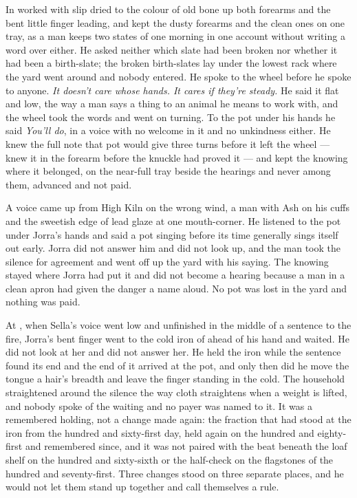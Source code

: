 \scenebreak

In   worked with slip dried to the colour of old bone up both forearms and the bent little finger leading, and kept the dusty forearms and the clean ones on one tray, as a man keeps two states of one morning in one account without writing a word over either. He asked neither which slate had been broken nor whether it had been a birth-slate; the broken birth-slates lay under the lowest rack where the yard went around and nobody entered. He spoke to the wheel before he spoke to anyone. \emph{It doesn't care whose hands. It cares if they're steady.} He said it flat and low, the way a man says a thing to an animal he means to work with, and the wheel took the words and went on turning. To the pot under his hands he said \emph{You'll do}, in a voice with no welcome in it and no unkindness either. He knew the full note that pot would give three turns before it left the wheel --- knew it in the forearm before the knuckle had proved it --- and kept the knowing where it belonged, on the near-full tray beside the hearings and never among them, advanced and not paid.

A voice came up from High Kiln on the wrong wind, a man with Ash on his cuffs and the sweetish edge of lead glaze at one mouth-corner. He listened to the pot under Jorra's hands and said a pot singing before its time generally sings itself out early. Jorra did not answer him and did not look up, and the man took the silence for agreement and went off up the yard with his saying. The knowing stayed where Jorra had put it and did not become a hearing because a man in a clean apron had given the danger a name aloud. No pot was lost in the yard and nothing was paid.

At , when Sella's voice went low and unfinished in the middle of a sentence to the fire, Jorra's bent finger went to the cold iron of  ahead of his hand and waited. He did not look at her and did not answer her. He held the iron while the sentence found its end and the end of it arrived at the pot, and only then did he move the tongue a hair's breadth and leave the finger standing in the cold. The household straightened around the silence the way cloth straightens when a weight is lifted, and nobody spoke of the waiting and no payer was named to it. It was a remembered holding, not a change made again: the fraction that had stood at the iron from the hundred and sixty-first day, held again on the hundred and eighty-first and remembered since, and it was not paired with the beat beneath the loaf shelf on the hundred and sixty-sixth or the half-check on the flagstones of the hundred and seventy-first. Three changes stood on three separate places, and he would not let them stand up together and call themselves a rule.

